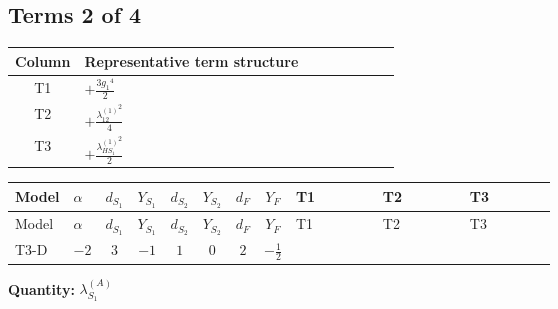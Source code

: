 \documentclass[8pt]{article}
\begin{document}
\begin{landscape}
\subsection*{Terms 2 of 4}
\begin{center}
\begin{tabular}{@{}c >{\raggedright\arraybackslash}p{0.82\linewidth}@{}}
\toprule
Column & Representative term structure \\
\midrule
T1 & \(\displaystyle +\frac{3 {g_1}^4}{2}\) \\
\midrule
T2 & \(\displaystyle +\frac{{\lambda_{12}^{(1)}}^2}{4}\) \\
\midrule
T3 & \(\displaystyle +\frac{{\lambda_{HS_1}^{(1)}}^2}{2}\) \\
\midrule
\bottomrule
\end{tabular}
\end{center}
\smallskip
\tiny
\begin{longtable}{@{}llcccccc >{\raggedright\arraybackslash}p{0.21\linewidth} >{\raggedright\arraybackslash}p{0.21\linewidth} >{\raggedright\arraybackslash}p{0.21\linewidth}@{}}
\toprule
Model & $\alpha$ & $d_{S_1}$ & $Y_{S_1}$ & $d_{S_2}$ & $Y_{S_2}$ & $d_F$ & $Y_F$ & T1 & T2 & T3 \\
\midrule
\endfirsthead
\toprule
Model & $\alpha$ & $d_{S_1}$ & $Y_{S_1}$ & $d_{S_2}$ & $Y_{S_2}$ & $d_F$ & $Y_F$ & T1 & T2 & T3 \\
\midrule
\endhead
T3-D & $-2$ & $3$ & $-1$ & $1$ & $0$ & $2$ & $-\frac{1}{2}$ & \scriptsize\adjustbox{max width=\linewidth}{$\begin{gathered} +\frac{3 {g_1}^4}{2}\end{gathered}$} & \scriptsize\adjustbox{max width=\linewidth}{$\begin{gathered} +\frac{{\lambda_{12}^{(1)}}^2}{4}\end{gathered}$} & \scriptsize\adjustbox{max width=\linewidth}{$\begin{gathered} +\frac{{\lambda_{HS_1}^{(1)}}^2}{2}\end{gathered}$} \\
\midrule
\bottomrule
\end{longtable}
\clearpage
\noindent\textbf{Quantity: }$\lambda_{S_1}^{(A)}$\par\smallskip

\end{landscape}
\end{document}
